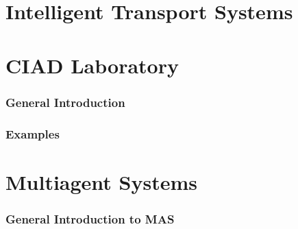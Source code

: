 \begin{bibliographysection}
\part{Intelligent Transport Systems}

\localized
\localized
\localized

\part{CIAD Laboratory}

\section{General Introduction}
\localized
\localized
\localized
\localized

\section{Examples}
\localized
\localized
\localized
\localized
\localized
\localized
\localized
\localized
\localized
\localized
\localized
\localized
\localized
\localized
\localized
\localized
\localized

\part{Multiagent Systems}

\section{General Introduction to MAS}
\localized
\localized
\localized
\localized


\end{bibliographysection}
